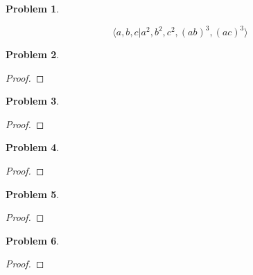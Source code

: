 \documentclass[10pt]{article}
\newcommand{\sk}{\vskip 10mm}
\theoremstyle{plain}
\newtheorem{problem}{Problem}
\theoremstyle{remark}
\begin{document}
\begin{problem} %
  
\end{problem}

\[\langle a,b,c | a^2,b^2,c^2,(ab)^3,(ac)^3 \rangle\]

\sk

\begin{problem} %
  
\end{problem}

\begin{proof}
  
\end{proof}

\sk

\begin{problem} %
  
\end{problem}

\begin{proof}
  
\end{proof}

\sk

\begin{problem} %
  
\end{problem}

\begin{proof}
  
\end{proof}

\sk

\begin{problem} %
  
\end{problem}

\begin{proof}
  
\end{proof}

\sk

\begin{problem} %
  
\end{problem}

\begin{proof}
  
\end{proof}

\sk

\end{document}

